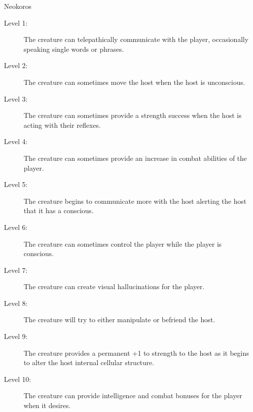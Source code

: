 \begin{commentbox}{Neokoros}
	\begin{description}
		\item[Level 1:] The creature can telepathically communicate with the player, occasionally speaking single words or phrases.
		\item[Level 2:] The creature can sometimes move the host when the host is unconscious.
		\item[Level 3:] The creature can sometimes provide a strength success when the host is acting with their reflexes. 
		\item[Level 4:] The creature can sometimes provide an increase in combat abilities of the player.
		\item[Level 5:] The creature begins to communicate more with the host alerting the host that it has a conscious.
		\item[Level 6:] The creature can sometimes control the player while the player is conscious.
		\item[Level 7:] The creature can create visual hallucinations for the player.
		\item[Level 8:] The creature will try to either manipulate or befriend the host.
		\item[Level 9:] The creature provides a permanent +1 to strength to the host as it begins to alter the host internal cellular structure.
		\item[Level 10:] The creature can provide intelligence and combat bonuses for the player when it desires. 
 	\end{description}
\end{commentbox}


